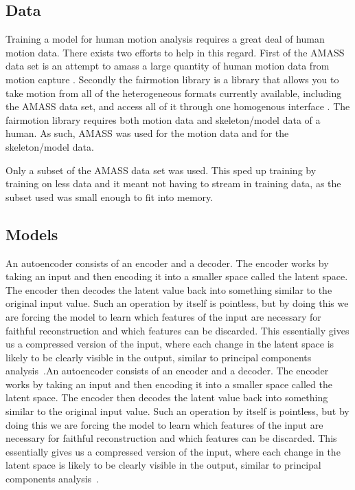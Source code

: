 \subsection{Data}\label{subsec:data}
Training a model for human motion analysis requires a great deal of human motion data. There exists two efforts to help in this regard. First of the AMASS data set is an attempt to amass a large quantity of human motion data from motion capture \cite{AMASS:2019}. Secondly the fairmotion library is a library that allows you to take motion from all of the heterogeneous formats currently available, including the AMASS data set, and access all of it through one homogenous interface \cite{gopinath2020fairmotion}. The fairmotion library requires both motion data and skeleton/model data of a human. As such, AMASS was used for the motion data and \cite{MANO:2017} for the skeleton/model data.

Only a subset of the AMASS data set was used. This sped up training by training on less data and it meant not having to stream in training data, as the subset used was small enough to fit into memory.

\subsection{Models}\label{subsec:models}
An autoencoder consists of an encoder and a decoder. The encoder works by taking an input and then encoding it into a smaller space called the latent space. The encoder then decodes the latent value back into something similar to the original input value. Such an operation by itself is pointless, but by doing this we are forcing the model to learn which features of the input are necessary for faithful reconstruction and which features can be discarded. This essentially gives us a compressed version of the input, where each change in the latent space is likely to be clearly visible in the output, similar to principal components analysis~\cite{TODO}.An autoencoder consists of an encoder and a decoder. The encoder works by taking an input and then encoding it into a smaller space called the latent space. The encoder then decodes the latent value back into something similar to the original input value. Such an operation by itself is pointless, but by doing this we are forcing the model to learn which features of the input are necessary for faithful reconstruction and which features can be discarded. This essentially gives us a compressed version of the input, where each change in the latent space is likely to be clearly visible in the output, similar to principal components analysis~\cite{TODO}.


